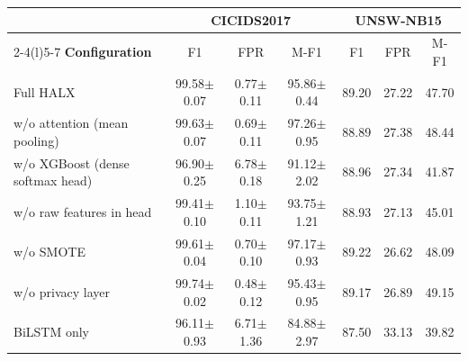 \begin{tabular}{@{}l@{\hspace{2pt}}cccccc@{}}
\toprule
 & \multicolumn{3}{c}{\textbf{CICIDS2017}} & \multicolumn{3}{c}{\textbf{UNSW-NB15}} \\
\cmidrule(lr){2-4}\cmidrule(l){5-7}
\textbf{Configuration} & F1 & FPR & M-F1 & F1 & FPR & M-F1 \\
\midrule
Full HALX & 99.58{\tiny$\pm$0.07} & 0.77{\tiny$\pm$0.11} & 95.86{\tiny$\pm$0.44} & 89.20 & 27.22 & 47.70 \\
w/o attention (mean pooling) & 99.63{\tiny$\pm$0.07} & 0.69{\tiny$\pm$0.11} & 97.26{\tiny$\pm$0.95} & 88.89 & 27.38 & 48.44 \\
w/o XGBoost (dense softmax head) & 96.90{\tiny$\pm$0.25} & 6.78{\tiny$\pm$0.18} & 91.12{\tiny$\pm$2.02} & 88.96 & 27.34 & 41.87 \\
w/o raw features in head & 99.41{\tiny$\pm$0.10} & 1.10{\tiny$\pm$0.11} & 93.75{\tiny$\pm$1.21} & 88.93 & 27.13 & 45.01 \\
w/o SMOTE & 99.61{\tiny$\pm$0.04} & 0.70{\tiny$\pm$0.10} & 97.17{\tiny$\pm$0.93} & 89.22 & 26.62 & 48.09 \\
w/o privacy layer & 99.74{\tiny$\pm$0.02} & 0.48{\tiny$\pm$0.12} & 95.43{\tiny$\pm$0.95} & 89.17 & 26.89 & 49.15 \\
BiLSTM only & 96.11{\tiny$\pm$0.93} & 6.71{\tiny$\pm$1.36} & 84.88{\tiny$\pm$2.97} & 87.50 & 33.13 & 39.82 \\
\bottomrule
\end{tabular}
